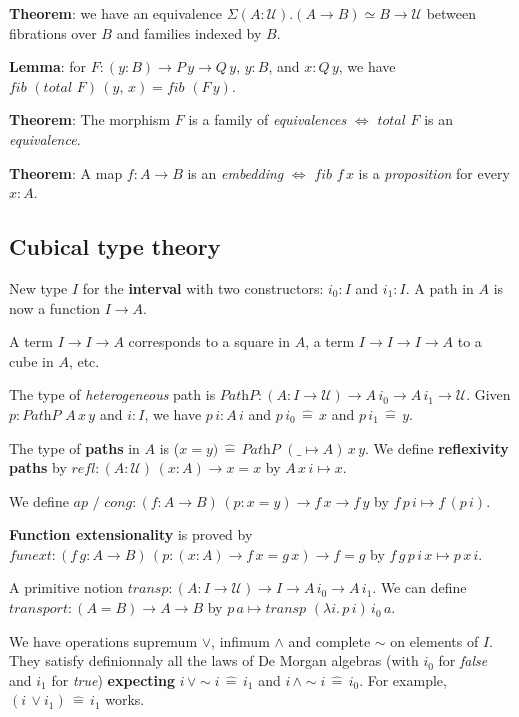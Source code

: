 \documentclass[a4paper]{article}
\begin{document}
\textbf{Theorem}: we have an equivalence $\Sigma(A : \mathcal{U}).(A \to B) \simeq B \to \mathcal{U}$ between fibrations over $B$ and families indexed by $B$.

\textbf{Lemma}: for $F : (y : B) \to P \, y \to Q \, y$, $y : B$, and $x : Q \, y$, we have $\textit{fib } (\textit{total } F) \, (y, \, x) = \textit{fib } (F \, y)$.

\textbf{Theorem}: The morphism $F$ is a family of \textit{equivalences} $\iff$ $\textit{total } F$ is an \textit{equivalence}.

\textbf{Theorem}: A map $f : A \to B$ is an \textit{embedding} $\iff$ $\textit{fib } f \, x$ is a \textit{proposition} for every $x : A$.

\subsection*{Cubical type theory}

New type $I$ for the \textbf{interval} with two constructors: $i_0 : I$ and $i_1 : I$. A path in $A$ is now a function $I \to A$.

A term $I \to I \to A$ corresponds to a square in $A$, a term $I \to I \to I \to A$ to a cube in $A$, etc.

The type of \textit{heterogeneous} path is $\textit{PathP} : (A : I \to \mathcal{U}) \to A \, i_0 \to A \, i_1 \to \mathcal{U}$. Given $p : \textit{PathP } A \, x \, y$ and $i : I$, we have $p \, i : A \, i$ and $p \, i_0 \, \hat{=} \, x$ and $p \, i_1 \, \hat{=} \, y$.

The type of \textbf{paths} in $A$ is ($x = y) \, \hat{=} \, \textit{PathP } (\_ \mapsto A) \, x \, y$. We define \textbf{reflexivity paths} by $\textit{refl} : (A : \mathcal{U}) \, (x : A) \to x = x$ by $A \, x \, i \mapsto x$.

We define $\textit{ap / cong} : (f : A \to B) \, (p : x = y) \to f \, x \to f \, y$ by $f \, p \, i \mapsto f \, (p \, i)$.

\textbf{Function extensionality} is proved by $\textit{funext} : (f \, g : A \to B) \, (p : (x : A) \to f \, x = g \, x) \to f = g$ by $f \, g \, p \, i \, x \mapsto p \, x \, i$.

A primitive notion $\textit{transp} : (A : I \to \mathcal{U}) \to I \to A \, i_0 \to A \, i_1$. We can define $\textit{transport} : (A = B) \to A \to B$ by $p \, a \mapsto \textit{transp } (\lambda i. \, p \, i) \, i_0 \, a$.

We have operations supremum $\vee$, infimum $\wedge$ and complete $\sim$ on elements of $I$. They satisfy definionnaly all the laws of De Morgan algebras (with $i_0$ for \textit{false} and $i_1$ for \textit{true}) \textbf{expecting} $i \, \vee \sim i \, \hat{=} \, i_1$ and $i \, \wedge \sim i \, \hat{=} \, i_0$. For example, $(i \, \vee i_1) \, \hat{=} \, i_1$ works.
\end{document}
